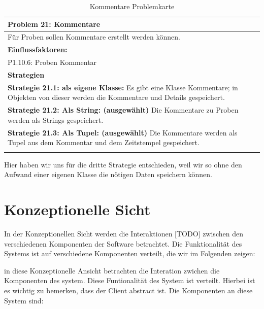 \documentclass[enabledeprecatedfontcommands,fontsize=12pt,paper=a4,twoside]{scrartcl}
\begin{document}
\begin{table}[H]
    \centering
    \begin{tabular}{|p{15cm}|}
    \hline
          \textbf{Problem 21:} Kommentare
          \\ \hline
          Für Proben sollen Kommentare erstellt werden können. 
          \\ \hline
          \textbf{Einflussfaktoren: } \\
         P1.10.6: Proben Kommentar \\ 
          \hline
          \textbf{Strategien} \\ \hline
          {}          
           \label{strategie:21.1} 
	\textbf{Strategie 21.1: als eigene Klasse: } Es gibt eine Klasse Kommentare; in Objekten von dieser werden die Kommentare und Details gespeichert. \\
	{}          
           \label{strategie:21.2} 
	\textbf{Strategie 21.2: Als String: (ausgewählt)} Die Kommentare zu Proben werden als Strings gespeichert. \\
	\textbf{Strategie 21.3: Als Tupel: (ausgewählt)} Die Kommentare werden als Tupel aus dem Kommentar und dem Zeitstempel gespeichert. \\
          \\ \hline
    \end{tabular}
    \caption{Kommentare Problemkarte}
    \label{tab:ProblemKarte21}
\end{table}
Hier haben wir uns für die dritte Strategie entschieden, weil wir so ohne den Aufwand einer eigenen Klasse die nötigen Daten speichern können. \\



\section{Konzeptionelle Sicht}
\label{sec:konzeptionell}
{ %
In der Konzeptionellen Sicht werden die Interaktionen [TODO] zwischen den verschiedenen Komponenten der Software betrachtet. Die Funktionalität des Systems ist auf verschiedene Komponenten verteilt, die wir im Folgenden zeigen:\\
}

in diese Konzeptionelle Ansicht betrachten die Interation zwichen die Komponenten des system. Diese Funtionalität des System ist verteilt. Hierbei ist es wichtig zu bemerken, dass der Client abstract ist. Die Komponenten an diese System sind: \\
\end{document}
